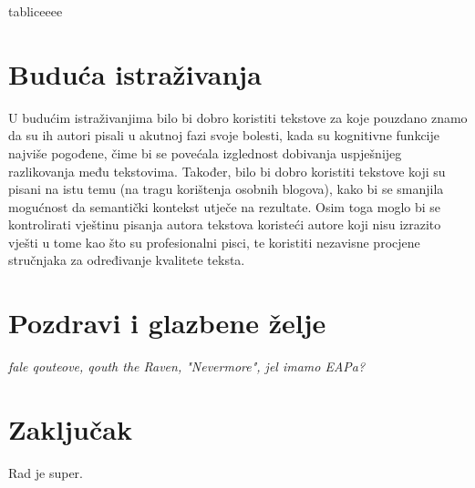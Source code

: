 \documentclass[10pt, a4paper]{article}
\begin{document}
tabliceeee

\section{Buduća istraživanja}
U budućim istraživanjima bilo bi dobro koristiti tekstove za koje pouzdano znamo da su ih autori pisali u akutnoj fazi svoje bolesti, kada su kognitivne funkcije najviše pogođene, čime bi se povećala izglednost dobivanja uspješnijeg razlikovanja među tekstovima. Također, bilo bi dobro koristiti tekstove koji su pisani na istu temu (na tragu korištenja osobnih blogova), kako bi se smanjila mogućnost da semantički kontekst utječe na rezultate. Osim toga moglo bi se kontrolirati vještinu pisanja autora tekstova koristeći autore koji nisu izrazito vješti u tome kao što su profesionalni pisci, te koristiti nezavisne procjene stručnjaka za određivanje kvalitete teksta.


\section{Pozdravi i glazbene želje}

\emph{fale qouteove, qouth the Raven, "Nevermore", jel imamo EAPa?}



\section{Zaključak}

Rad je super.




 
\end{document}
